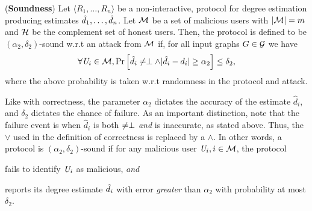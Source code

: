 \begin{defn}\label{chap4-def:sound}(\textbf{Soundness}) Let $\langle R_1, \ldots, R_n\rangle$ be a non-interactive, \ldp{} protocol for degree estimation producing estimates $\hat{d}_1, \ldots, \hat{d}_n$. Let $\mathcal{M}$ be a set of malicious users with $|\mathcal{M}| = m$ and $\mathcal{H}$ be the complement set of honest users. Then, the protocol is defined to be $(\alpha_2, \delta_2)$-sound w.r.t an attack from $\mathcal{M}$ if, for all input graphs $G \in \mathcal{G}$ we have
  \begin{gather}
    \forall \textit{U}_i \in \mathcal{M}, \mathrm{Pr}\left[\hat{d}_i \neq \perp \wedge |\hat{d}_i -
    d_i| \geq \alpha_2\right]\leq \delta_2, \label{chap4-eq:sound1}
  \end{gather}
  where the above probability is taken w.r.t randomness in the protocol and attack.
\end{defn}
Like with correctness, the parameter $\alpha_2$ dictates the accuracy of the estimate $\hat{d}_i$, and $\delta_2$ dictates the chance of failure. As an important distinction, note that the failure event is when $\hat{d}_i$ is both $\neq \perp$ \textit{and} is inaccurate, as stated above. Thus, the $\vee$ used in the definition of correctness is replaced by a $\wedge$. In other words, a protocol is $(\alpha_2,\delta_2)$-sound if for any malicious user $\textit{U}_i, i \in \mathcal{M}$, the protocol \squishlist \item fails to identify $\textit{U}_i$ as malicious, \textit{and} \item reports its degree estimate $\hat{d}_i$ with error \textit{greater} than $\alpha_2$ \squishend  with probability at most $\delta_2$.

